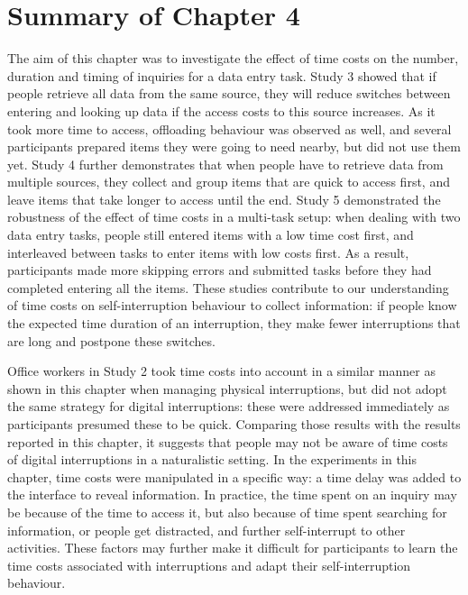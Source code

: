 \section{Summary of Chapter 4}
The aim of this chapter was to investigate the effect of time costs on the number, duration and timing of inquiries for a data entry task. Study 3 showed that if people retrieve all data from the same source, they will reduce switches between entering and looking up data if the access costs to this source increases. As it took more time to access, offloading behaviour was observed as well, and several participants prepared items they were going to need nearby, but did not use them yet. Study 4 further demonstrates that when people have to retrieve data from multiple sources, they collect and group items that are quick to access first, and leave items that take longer to access until the end. Study 5 demonstrated the robustness of the effect of time costs in a multi-task setup: when dealing with two data entry tasks, people still entered items with a low time cost first, and interleaved between tasks to enter items with low costs first. As a result, participants made more skipping errors and submitted tasks before they had completed entering all the items. These studies contribute to our understanding of time costs on self-interruption behaviour to collect information: if people know the expected time duration of an interruption, they make fewer interruptions that are long and postpone these switches. 

Office workers in Study 2 took time costs into account in a similar manner as shown in this chapter when managing physical interruptions, but did not adopt the same strategy for digital interruptions: these were addressed immediately as participants presumed these to be quick. Comparing those results with the results reported in this chapter, it suggests that people may not be aware of time costs of digital interruptions in a naturalistic setting. In the experiments in this chapter, time costs were manipulated in a specific way: a time delay was added to the interface to reveal information. In practice, the time spent on an inquiry may be because of the time to access it, but also because of time spent searching for information, or people get distracted, and further self-interrupt to other activities. These factors may further make it difficult for participants to learn the time costs associated with interruptions and adapt their self-interruption behaviour. 


